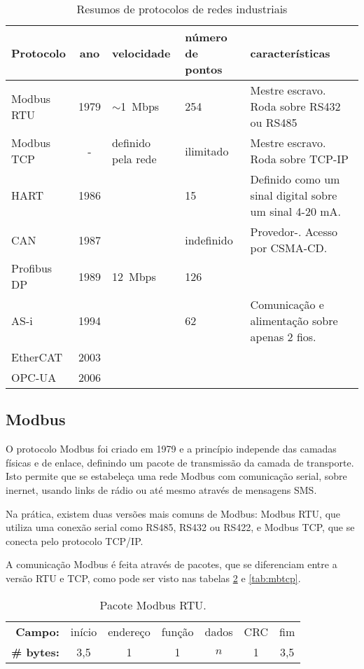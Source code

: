 \begin{table}[h]
    \caption{Resumos de protocolos de redes industriais}\label{tab:protocolos}
    \begin{tabular}{l|cp{20mm}p{20mm}p{35mm}}
        \hline
        Protocolo & ano & velocidade & número de pontos & características\\
        \hline
        Modbus RTU & 1979 & $\sim$1~Mbps & 254 & Mestre escravo. Roda sobre RS432 ou RS485\\
        Modbus TCP & - & definido pela rede & ilimitado & Mestre escravo. Roda sobre TCP-IP\\
        HART & 1986 & & 15 & Definido como um sinal digital sobre um sinal 4-20 mA.\\
        CAN & 1987 & & indefinido & Provedor-. Acesso por CSMA-CD.\\
        Profibus DP & 1989 & 12~Mbps & 126 & \\
        AS-i & 1994 & & 62 & Comunicação e alimentação sobre apenas 2 fios.\\
        EtherCAT & 2003 & & & \\
        OPC-UA & 2006 & & & \\
        \hline
    \end{tabular}
\end{table}

\subsection{Modbus}

O protocolo Modbus foi criado em 1979 e a princípio independe das camadas físicas e de enlace, definindo um pacote de transmissão da camada de transporte. Isto permite que se estabeleça uma rede Modbus com comunicação serial, sobre inernet, usando links de rádio ou até mesmo através de mensagens SMS.

Na prática, existem duas versões mais comuns de Modbus: Modbus RTU, que utiliza uma conexão serial como RS485, RS432 ou RS422, e Modbus TCP, que se conecta pelo protocolo TCP/IP.

A comunicação Modbus é feita através de pacotes, que se diferenciam entre a versão RTU e TCP, como pode ser visto nas tabelas \ref{tab:mbrtu} e \ref{tab:mbtcp}.

\begin{table}
    \centering
    \caption{Pacote Modbus RTU.}\label{tab:mbrtu}
    \begin{tabular}{r|c|c|c|c|c|c|}
        \cline{2-7}
        \textbf{Campo:} & início & endereço & função & dados & CRC & fim\\
        \cline{2-7}
        \textbf{\# bytes:} & 3,5 & 1 & 1 & $n$ & 1 & 3,5 \\
        \cline{2-7}
    \end{tabular}
\end{table}

